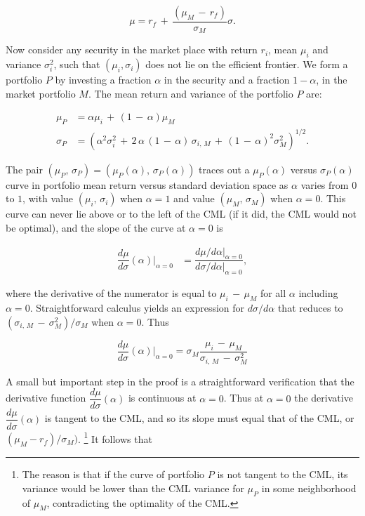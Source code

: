\documentclass[graybox,envcountchap,sectrefs]{svmono}\usepackage[]{graphicx}\usepackage[]{xcolor}
\begin{document}
\begin{appendices}
\begin{equation}
\mu=r_{f}\,+\,\dfrac{(\mu_{M}\,-\,r_{f})}{\sigma_{M}}\sigma.\label{eq: CML}
\end{equation}

Now consider any security in the market place with return $r_{i}$,
mean $\mu_{i}$ and variance $\sigma_{i}^{2}$, such that $(\mu_{i},\sigma_{i})$
does not lie on the efficient frontier. We form a portfolio $P$ by
investing a fraction $\alpha$ in the security and a fraction $1-\alpha$,
in the market portfolio $M$. The mean return and variance of the
portfolio $P$ are:

\begin{align*}
\mu_{P} & =\alpha\mu_{i}\,+\,(1\,-\,\alpha)\mu_{M}\\
\sigma_{P} & =\left(\alpha^{2}\sigma_{i}^{2}\,+\,2\,\alpha\,(1\,-\,\alpha)\,\sigma_{i,\,M}\,+\,(1\,-\,\alpha)^{2}\sigma_{M}^{2}\right)^{1/2}.
\end{align*}

The pair $(\mu_{P},\,\sigma_{P})=(\mu_{P}(\alpha),\,\sigma_{P}(\alpha))$
traces out a $\mu_{P}(\alpha)$ versus $\sigma_{P}(\alpha)$ curve
in portfolio mean return versus standard deviation space as $\alpha$
varies from $0$ to $1$, with value $(\mu_{i},\,\sigma_{i})$ when
$\alpha=1$ and value $(\mu_{M},\,\sigma_{M})$ when $\alpha=0$.
This curve can never lie above or to the left of the CML (if it did,
the CML would not be optimal), and the slope of the curve at $\alpha=0$
is

\begin{align}
\dfrac{d\mu}{d\sigma}(\alpha)\Biggr|_{\alpha=0} & =\dfrac{d\mu/d\alpha\bigr|_{\alpha=0}}{d\sigma/d\alpha\bigr|_{\alpha=0}},\label{eq: DmuDsigmaFunction}
\end{align}

where the derivative of the numerator is equal to $\mu_{i}\,-\,\mu_{M}$
for all $\alpha$ including $\alpha=0$. Straightforward calculus
yields an expression for $d\sigma/d\alpha$ that reduces to $\left(\sigma_{i,\,M}\,-\,\sigma_{M}^{2}\right)/\sigma_{M}$
when $\alpha=0$. Thus

\begin{equation}
\dfrac{d\mu}{d\sigma}(\alpha)\Biggr|_{\alpha=0}=\sigma_{M}\dfrac{\mu_{i}\,-\,\mu_{M}}{\sigma_{i,\,M}\,-\,\sigma_{M}^{2}}\label{eq: DmuDsigmaAtMarketPort}
\end{equation}

A small but important step in the proof is a straightforward verification
that the derivative function $\dfrac{d\mu}{d\sigma}(\alpha)$ is continuous
at $\alpha=0$. Thus at $\alpha=0$ the derivative $\dfrac{d\mu}{d\sigma}(\alpha)$
is tangent to the CML, and so its slope must equal that of the CML,
or $(\mu_{M}-r_{f})/\sigma_{M})$. \footnote{The reason is that if the curve of portfolio $P$ is not tangent to
the CML, its variance would be lower than the CML variance for $\mu_{P}$
in some neighborhood of $\mu_{M}$, contradicting the optimality of
the CML.} It follows that


\end{appendices}
\end{document}
